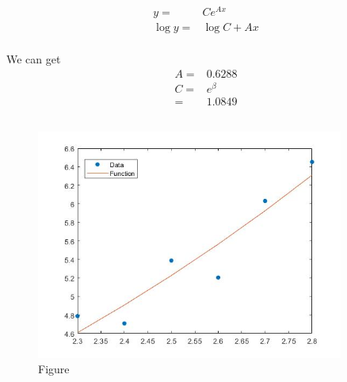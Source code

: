 \documentclass{article}
\begin{document}
    \section{}
        \subsection{}
            \begin{equation*}
                \begin{split}
                    y=&Ce^{Ax}\\
                    \log y=& \log C + Ax\\
                \end{split}
            \end{equation*}
            
            
            We can get
            \begin{equation*}
                \begin{split}
                    A=&0.6288\\
                    C=&e^\beta\\
                        =&1.0849 
                \end{split}
            \end{equation*}
        \subsection{}
            \begin{figure}[H] 
                \centering 
                \includegraphics[width=0.9\textwidth]{img/Assignement_4_2_1.jpg}
                \caption{Figure} 
            \end{figure}
    \newpage
\end{document}
